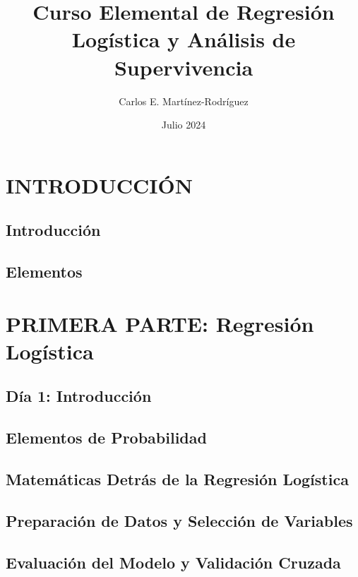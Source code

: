 \documentclass{report}
\title{Curso Elemental de Regresión Logística y Análisis de Supervivencia}
\author{Carlos E. Martínez-Rodríguez}
\date{Julio 2024}
\begin{document}
\maketitle

\tableofcontents
\part{INTRODUCCIÓN}
\chapter{Introducción}


\chapter{Elementos}


\part{PRIMERA PARTE: Regresión Logística}

\chapter{Día 1: Introducción}


\chapter{Elementos de Probabilidad}




\chapter{Matemáticas Detrás de la Regresión Logística}


\chapter{Preparación de Datos y Selección de Variables}


\chapter{Evaluación del Modelo y Validación Cruzada}

\end{document}
